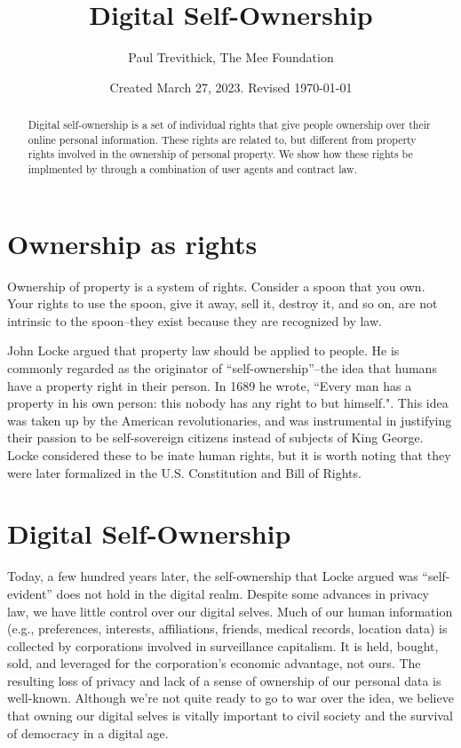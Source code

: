 \documentclass[11pt, oneside]{article}   	%
\title{Digital Self-Ownership}
\author{Paul Trevithick, The Mee Foundation}
\date{Created March 27, 2023. Revised \today}
\begin{document}
\maketitle
\begin{abstract}
	Digital self-ownership is a set of individual rights that give people ownership over their online personal information. These rights are related to, but different from property rights involved in the ownership of personal property. We show how these rights be implmented by through a combination of user agents and contract law.
\end{abstract}

\section{Ownership as rights}
Ownership of property is a system of rights. Consider a spoon that you own. Your rights to use the spoon, give it away, sell it, destroy it, and so on, are not intrinsic to the spoon--they exist because they are recognized by law.

John Locke argued that property law should be applied to people. He is commonly regarded as the originator of ``self-ownership''--the idea that humans have a property right in their person. In 1689 he wrote, ``Every man has a property in his own person: this nobody has any right to but himself."\cite{Locke1689}. This idea was taken up by the American revolutionaries, and was instrumental in justifying their passion to be self-sovereign citizens instead of subjects of King George. Locke considered these to be inate human rights, but it is worth noting that they were later formalized in the U.S. Constitution and Bill of Rights. 

\section{Digital Self-Ownership}

Today, a few hundred years later, the self-ownership that Locke argued was “self-evident” does not hold in the digital realm. Despite some advances in privacy law, we have little control over our digital selves. Much of our human information (e.g., preferences, interests, affiliations, friends, medical records, location data) is collected by corporations involved in surveillance capitalism\cite{zuboff2019}. It is held, bought, sold, and leveraged for the corporation’s economic advantage, not ours. The resulting loss of privacy and lack of a sense of ownership of our personal data is well-known. Although we're not quite ready to go to war over the idea, we believe that owning our digital selves is vitally important to civil society and the survival of democracy in a digital age. 
\end{document}
